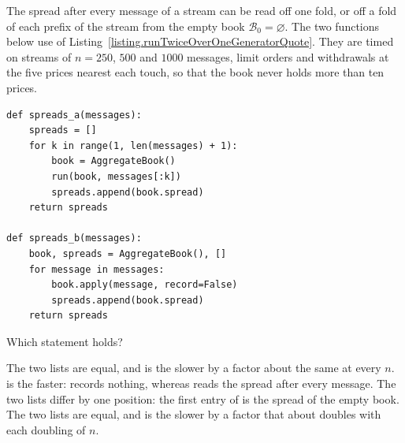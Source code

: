 \begin{question}
\label{question.spreadsRefoldedFromEmpty}
The spread after every message of a stream can be read off one fold,
or off a fold of each prefix of the stream from the empty book $\mathcal{B}_0 = \varnothing$.
The two functions below use  of Listing~\ref{listing.runTwiceOverOneGeneratorQuote}.
They are timed on streams of $n = 250$, $500$ and $1000$ messages,
limit orders and withdrawals at the five prices nearest each touch,
so that the book never holds more than ten prices.
\begin{lstlisting}[caption={Two series of spreads}, label=listing.spreadsRefoldedFromEmptySeries]
def spreads_a(messages):
    spreads = []
    for k in range(1, len(messages) + 1):
        book = AggregateBook()
        run(book, messages[:k])
        spreads.append(book.spread)
    return spreads

def spreads_b(messages):
    book, spreads = AggregateBook(), []
    for message in messages:
        book.apply(message, record=False)
        spreads.append(book.spread)
    return spreads
\end{lstlisting}
Which statement holds?
\begin{choices}
 \choice The two lists are equal, and  is the slower
  by a factor about the same at every $n$.
 \choice {} is the faster:
   records nothing, whereas  reads the spread after every message.
 \choice The two lists differ by one position:
  the first entry of  is the spread of the empty book.
 \correctchoice The two lists are equal, and  is the slower
  by a factor that about doubles with each doubling of $n$.
\end{choices}
\end{question}

